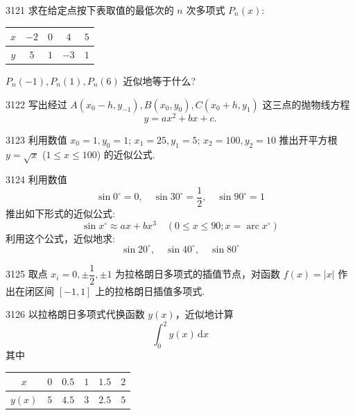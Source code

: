 
\begin{prob}[M]{3121}
求在给定点按下表取值的最低次的 $n$ 次多项式 $P_n(x)$:
\begin{center}
\begin{tabular}{|c|c|c|c|c|}
\hline
$x$ & $-2$ & $0$ & $4$ & $5$ \\
\hline
$y$ & $5$ & $1$ & $-3$ & $1$ \\
\hline
\end{tabular}
\end{center}
$P_n(-1), P_n(1), P_n(6)$ 近似地等于什么?
\end{prob}

\begin{prob}[M]{3122}
写出经过 $A(x_0 - h, y_{-1}), B(x_0, y_0), C(x_0 + h, y_1)$ 这三点的抛物线方程
\[
y = ax^2 + bx + c.
\]
\end{prob}

\begin{prob}[M]{3123}
利用数值 $x_0 = 1, y_0 = 1$; $x_1 = 25, y_1 = 5$; $x_2 = 100, y_2 = 10$ 推出开平方根 $y = \sqrt{x}$ ($1 \leqslant x \leqslant 100$) 的近似公式.
\end{prob}

\begin{prob}[M]{3124}
利用数值
\[
\sin 0^\circ = 0, \quad \sin 30^\circ = \frac{1}{2}, \quad \sin 90^\circ = 1
\]
推出如下形式的近似公式:
\[
\sin x^\circ \approx ax + bx^3 \quad (0 \leqslant x \leqslant 90; x = \operatorname{arc} x^\circ)
\]
利用这个公式，近似地求:
\[
\sin 20^\circ, \quad \sin 40^\circ, \quad \sin 80^\circ
\]
\end{prob}

\begin{prob}[M]{3125}
取点 $x_i = 0, \pm \dfrac{1}{2}, \pm 1$ 为拉格朗日多项式的插值节点，对函数 $f(x) = |x|$ 作出在闭区间 $[-1, 1]$ 上的拉格朗日插值多项式.
\end{prob}

\begin{prob}[M]{3126}
以拉格朗日多项式代换函数 $y(x)$，近似地计算
\[
\int_{0}^{2} y(x) \,\mathrm{d}x
\]
其中
\begin{center}
\begin{tabular}{|c|c|c|c|c|c|}
\hline
$x$ & $0$ & $0.5$ & $1$ & $1.5$ & $2$ \\
\hline
$y(x)$ & $5$ & $4.5$ & $3$ & $2.5$ & $5$ \\
\hline
\end{tabular}
\end{center}
\end{prob}

